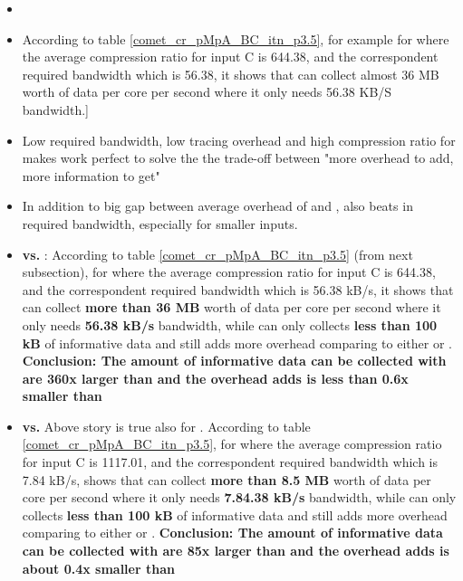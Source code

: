 \begin{itemize}
\item 
\item According to table \ref{comet_cr_pMpA_BC_itn_p3.5}, for example for \parlota where the average compression ratio for input C is 644.38, and the correspondent required bandwidth which is 56.38, it shows that \parlot can collect almost 36 MB worth of data per core per second where it only needs 56.38 KB/S bandwidth.]
\item Low required bandwidth, low tracing overhead and high compression ratio for makes \parlot work perfect to solve the the trade-off between "more overhead to add, more information to get"
\item In addition to big gap between average overhead of \parlotm and \callgrind, \parlotm also beats \callgrind in required bandwidth, especially for smaller inputs.
	\item \textbf{\parlota vs. \callgrind}: According to table \ref{comet_cr_pMpA_BC_itn_p3.5} (from next subsection), for \parlota where the average compression ratio for input C is 644.38, and the correspondent required bandwidth which is 56.38 kB/s, it shows that \parlota can collect \textbf{more than 36 MB} worth of data per core per second where it only needs \textbf{56.38 kB/s} bandwidth, while \callgrind can only collects \textbf{less than 100 kB} of informative data and still adds more overhead comparing to either \parlota or \parlotm. \textbf{Conclusion: The amount of informative data can be collected with \parlota  are 360x larger than \callgrind and the overhead \parlota adds is less than 0.6x smaller than \callgrind}
	\item \textbf{\parlotm vs. \callgrind} Above story is true also for \parlotm. According to table \ref{comet_cr_pMpA_BC_itn_p3.5}, for \parlotm where the average compression ratio for input C is 1117.01, and the correspondent required bandwidth which is 7.84 kB/s, shows that \parlotm can collect \textbf{more than 8.5 MB} worth of data per core per second where it only needs \textbf{7.84.38 kB/s} bandwidth, while \callgrind can only collects \textbf{less than 100 kB} of informative data and still adds more overhead comparing to either \parlota or \parlotm. \textbf{Conclusion: The amount of informative data can be collected with \parlotm  are 85x larger than \callgrind and the overhead \parlotm adds is about 0.4x smaller than \callgrind}
\end{itemize}




